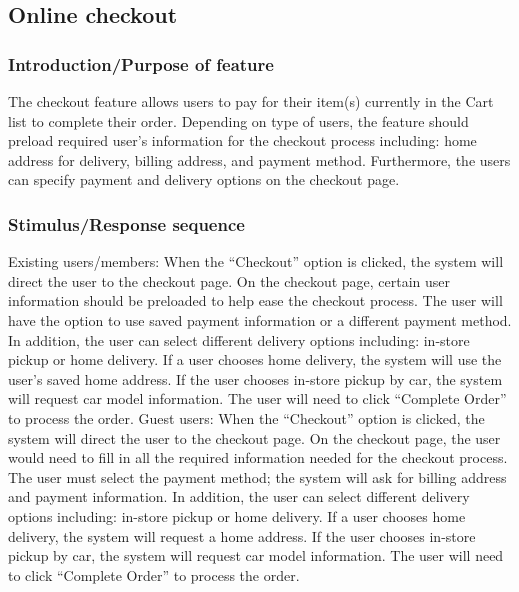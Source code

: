 \documentclass{scrreprt}
\theoremstyle{funreq}
\begin{document}
	
	
	\subsection{Online checkout}
	
	
	
	\subsubsection{Introduction/Purpose of feature}
	The checkout feature allows users to pay for their item(s) currently in the Cart list to complete their order. Depending on type of users, the feature should preload required user’s information for the checkout process including: home address for delivery, billing address, and payment method. Furthermore, the users can specify payment and delivery options on the checkout page. 
	
	\subsubsection{Stimulus/Response sequence}
	Existing users/members:
	When the “Checkout” option is clicked, the system will direct the user to the checkout page. On the checkout page, certain user information should be preloaded to help ease the checkout process. The user will have the option to use saved payment information or a different payment method. In addition, the user can select different delivery options including: in-store pickup or home delivery. If a user chooses home delivery, the system will use the user's saved home address. If the user chooses in-store pickup by car, the system will request car model information. The user will need to click “Complete Order” to process the order.
	Guest users: 
	When the “Checkout” option is clicked, the system will direct the user to the checkout page. On the checkout page, the user would need to fill in all the required information needed for the checkout process. The user must select the payment method; the system will ask for billing address and payment information. In addition, the user can select different delivery options including: in-store pickup or home delivery. If a user chooses home delivery, the system will request a home address. If the user chooses in-store pickup by car, the system will request car model information. The user will need to click “Complete Order” to process the order.
	
\end{document}
